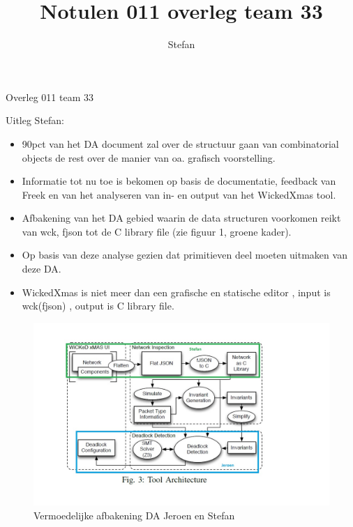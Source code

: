 \documentclass{article}
\title{Notulen 011 overleg team 33}
\author{Stefan}
\begin{document}

\begin{Minutes}{Overleg 011 team 33}

\maketitle%


Uitleg Stefan: 
\begin{itemize}
\item 90pct van het DA document zal over de structuur gaan van combinatorial objects de rest over de manier van oa. grafisch voorstelling.
\item Informatie tot nu toe is bekomen op basis de documentatie, feedback van Freek en van het analyseren van in- en output van het WickedXmas tool.
\item Afbakening van het DA gebied waarin de data structuren voorkomen reikt van wck, fjson tot de C library file (zie figuur 1, groene kader).
\item Op basis van deze analyse gezien dat primitieven deel moeten uitmaken van deze DA.
\item WickedXmas is niet meer dan een grafische en statische editor , input is wck(fjson) , output is C library file.
\end{itemize}

\begin{figure}[t]
  \includegraphics[width=\textwidth]{da_zones}
  \caption{Vermoedelijke afbakening DA Jeroen en Stefan}
\end{figure}




\end{Minutes}
\end{document}
